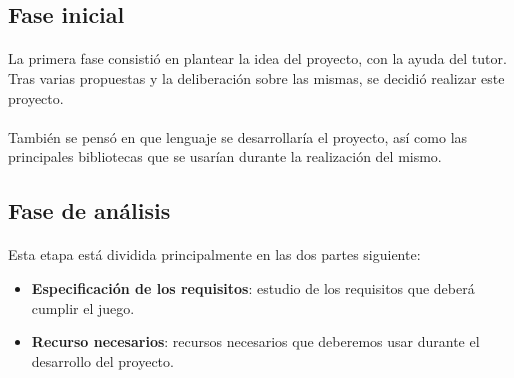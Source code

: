 \documentclass[a4paper,11pt]{article} %
\begin{document}
%    

\subsection{Fase inicial}

\paragraph{}
La primera fase consistió en plantear la idea del proyecto, con la ayuda del tutor. Tras varias
propuestas y la deliberación sobre las mismas, se decidió realizar este proyecto.

\paragraph{}
También se pensó en que lenguaje se desarrollaría el proyecto, así como las principales bibliotecas
que se usarían durante la realización del mismo.

\subsection{Fase de análisis}

\paragraph{}
Esta etapa está dividida principalmente en las dos partes siguiente:

\begin{itemize}
    \item \textbf{Especificación de los requisitos}: estudio de los requisitos que deberá cumplir el juego.
    
    \item \textbf{Recurso necesarios}: recursos necesarios que deberemos usar durante el desarrollo del proyecto.
\end{itemize}
\end{document}
